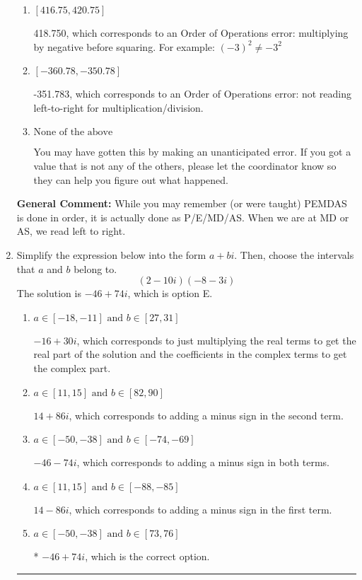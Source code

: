 \documentclass{extbook}[14pt]
\newcommand{\litem}[1]{\item #1

\rule{\textwidth}{0.4pt}}
\begin{document}
\begin{enumerate}
{\begin{enumerate}[label=\Alph*.]
 370.217, which corresponds to two Order of Operations errors.
\item \( [416.75, 420.75] \)

 418.750, which corresponds to an Order of Operations error: multiplying by negative before squaring. For example: $(-3)^2 \neq -3^2$
\item \( [-360.78, -350.78] \)

 -351.783, which corresponds to an Order of Operations error: not reading left-to-right for multiplication/division.
\item \( \text{None of the above} \)

 You may have gotten this by making an unanticipated error. If you got a value that is not any of the others, please let the coordinator know so they can help you figure out what happened.
\end{enumerate}

\textbf{General Comment:} While you may remember (or were taught) PEMDAS is done in order, it is actually done as P/E/MD/AS. When we are at MD or AS, we read left to right.
}
\litem{
Simplify the expression below into the form $a+bi$. Then, choose the intervals that $a$ and $b$ belong to.
\[ (2 - 10 i)(-8 - 3 i) \]The solution is \( -46 + 74 i \), which is option E.\begin{enumerate}[label=\Alph*.]
\item \( a \in [-18, -11] \text{ and } b \in [27, 31] \)

 $-16 + 30 i$, which corresponds to just multiplying the real terms to get the real part of the solution and the coefficients in the complex terms to get the complex part.
\item \( a \in [11, 15] \text{ and } b \in [82, 90] \)

 $14 + 86 i$, which corresponds to adding a minus sign in the second term.
\item \( a \in [-50, -38] \text{ and } b \in [-74, -69] \)

 $-46 - 74 i$, which corresponds to adding a minus sign in both terms.
\item \( a \in [11, 15] \text{ and } b \in [-88, -85] \)

 $14 - 86 i$, which corresponds to adding a minus sign in the first term.
\item \( a \in [-50, -38] \text{ and } b \in [73, 76] \)

* $-46 + 74 i$, which is the correct option.
\end{enumerate}

}
\end{enumerate}
\end{document}
